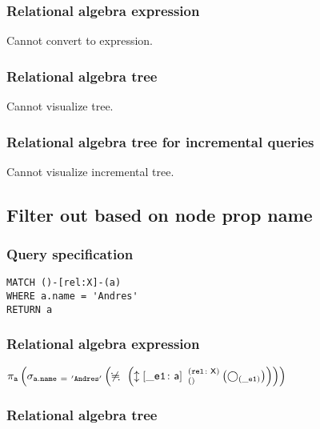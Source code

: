 \subsubsection*{Relational algebra expression}

Cannot convert to expression.

\subsubsection*{Relational algebra tree}

Cannot visualize tree.

\subsubsection*{Relational algebra tree for incremental queries}

Cannot visualize incremental tree.

\subsection{Filter out based on node prop name}

\subsubsection*{Query specification}

\begin{lstlisting}
MATCH ()-[rel:X]-(a)
WHERE a.name = 'Andres'
RETURN a
\end{lstlisting}

\subsubsection*{Relational algebra expression}

$\projection{\var{a}} \left(\selection{\mathtt{a.name~=~'Andres'}} \left(\alldifferent{} \left(\expandboth{\_e1}{a}{}{rel}{X} \left(\getvertices{\_e1}{}\right)\right)\right)\right)$

\subsubsection*{Relational algebra tree}


